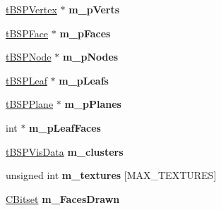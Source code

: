 \begin{DoxyCompactItemize}
\item 
\hyperlink{structt_b_s_p_vertex}{t\+B\+S\+P\+Vertex} $\ast$ {\bfseries m\+\_\+p\+Verts}\hypertarget{class_c_quake3_b_s_p_aa8b1307c8cadac3fbdaa2d2090689b30}{}\label{class_c_quake3_b_s_p_aa8b1307c8cadac3fbdaa2d2090689b30}

\item 
\hyperlink{structt_b_s_p_face}{t\+B\+S\+P\+Face} $\ast$ {\bfseries m\+\_\+p\+Faces}\hypertarget{class_c_quake3_b_s_p_ac341d879b0d52ed6036be45b117b0800}{}\label{class_c_quake3_b_s_p_ac341d879b0d52ed6036be45b117b0800}

\item 
\hyperlink{structt_b_s_p_node}{t\+B\+S\+P\+Node} $\ast$ {\bfseries m\+\_\+p\+Nodes}\hypertarget{class_c_quake3_b_s_p_a61af50f0545e0e9f17b30ba29a6d3012}{}\label{class_c_quake3_b_s_p_a61af50f0545e0e9f17b30ba29a6d3012}

\item 
\hyperlink{structt_b_s_p_leaf}{t\+B\+S\+P\+Leaf} $\ast$ {\bfseries m\+\_\+p\+Leafs}\hypertarget{class_c_quake3_b_s_p_ae45c76a84f9a10fd63a784a555018664}{}\label{class_c_quake3_b_s_p_ae45c76a84f9a10fd63a784a555018664}

\item 
\hyperlink{structt_b_s_p_plane}{t\+B\+S\+P\+Plane} $\ast$ {\bfseries m\+\_\+p\+Planes}\hypertarget{class_c_quake3_b_s_p_a3dcce071fe25a7e261b625ca136fbf6e}{}\label{class_c_quake3_b_s_p_a3dcce071fe25a7e261b625ca136fbf6e}

\item 
int $\ast$ {\bfseries m\+\_\+p\+Leaf\+Faces}\hypertarget{class_c_quake3_b_s_p_ae9d2411614785d4dcb304f6a17ffd2d6}{}\label{class_c_quake3_b_s_p_ae9d2411614785d4dcb304f6a17ffd2d6}

\item 
\hyperlink{structt_b_s_p_vis_data}{t\+B\+S\+P\+Vis\+Data} {\bfseries m\+\_\+clusters}\hypertarget{class_c_quake3_b_s_p_af579c8cdab13d65d04b8fe21da37dde6}{}\label{class_c_quake3_b_s_p_af579c8cdab13d65d04b8fe21da37dde6}

\item 
unsigned int {\bfseries m\+\_\+textures} \mbox{[}M\+A\+X\+\_\+\+T\+E\+X\+T\+U\+R\+ES\mbox{]}\hypertarget{class_c_quake3_b_s_p_ad39344a841f60c33fbad46c354cc1c04}{}\label{class_c_quake3_b_s_p_ad39344a841f60c33fbad46c354cc1c04}

\item 
\hyperlink{class_c_bitset}{C\+Bitset} {\bfseries m\+\_\+\+Faces\+Drawn}\hypertarget{class_c_quake3_b_s_p_a91c15f2d32d87985fdd6ea874e1f9707}{}\label{class_c_quake3_b_s_p_a91c15f2d32d87985fdd6ea874e1f9707}


\end{DoxyCompactItemize}
